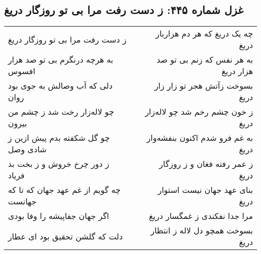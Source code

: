 \begin{center}
\section*{غزل شماره ۴۴۵: ز دست رفت مرا بی تو روزگار دریغ}
\label{sec:445}
\begin{longtable}{l p{0.5cm} r}
ز دست رفت مرا بی تو روزگار دریغ
&&
چه یک دریغ که هر دم هزاربار دریغ
\\
به هرچه درنگرم بی تو صد هزار افسوس
&&
به هر نفس که زنم بی تو صد هزار دریغ
\\
دلی که آب وصالش به جوی بود روان
&&
بسوخت زآتش هجر تو زار زار دریغ
\\
چو لاله‌زار رخت شد ز چشم من بیرون
&&
ز خون چشم رخم شد چو لاله‌زار دریغ
\\
چو گل شکفته بدم پیش ازین ز شادی وصل
&&
به غم فرو شدم اکنون بنفشه‌وار دریغ
\\
ز دور چرخ خروش و ز بخت بد فریاد
&&
ز عمر رفته فغان و ز روزگار دریغ
\\
چه گویم از غم عهد جهان که تا که جهانست
&&
بنای عهد جهان نیست استوار دریغ
\\
اگر جهان جفاپیشه را وفا بودی
&&
مرا جدا نفکندی ز غمگسار دریغ
\\
دلت که گلشن تحقیق بود ای عطار
&&
بسوخت همچو دل لاله ز انتظار دریغ
\\
\end{longtable}
\end{center}
